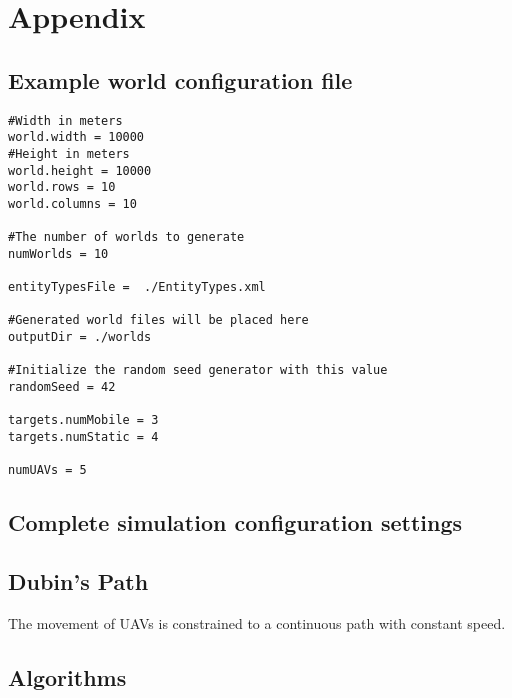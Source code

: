 \chapter{Appendix}


\section{Example world configuration file}
\label{sec:exampleWorldCfg}
\begin{verbatim}
#Width in meters
world.width = 10000
#Height in meters
world.height = 10000
world.rows = 10
world.columns = 10

#The number of worlds to generate
numWorlds = 10

entityTypesFile =  ./EntityTypes.xml

#Generated world files will be placed here
outputDir = ./worlds

#Initialize the random seed generator with this value
randomSeed = 42

targets.numMobile = 3
targets.numStatic = 4

numUAVs = 5
\end{verbatim}


\section{Complete simulation configuration settings}


\section{Dubin's Path} \label{sec:dubin}
The movement of UAVs is constrained to a continuous path with constant speed.


\section{Algorithms}
\label{sec:algorithms}

